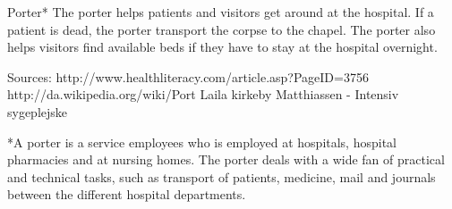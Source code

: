 Porter*
The porter helps patients and visitors get around at the hospital. If a patient is dead, the porter transport the corpse to the chapel. The porter also helps visitors find available beds if they have to stay at the hospital overnight. 

Sources:
http://www.healthliteracy.com/article.asp?PageID=3756
http://da.wikipedia.org/wiki/Port%
Laila kirkeby Matthiassen - Intensiv sygeplejske

*A porter is a service employees who is employed at hospitals, hospital pharmacies and at nursing homes. The porter deals with a wide fan of practical and technical tasks, such as transport of patients, medicine, mail and journals between the different hospital departments.